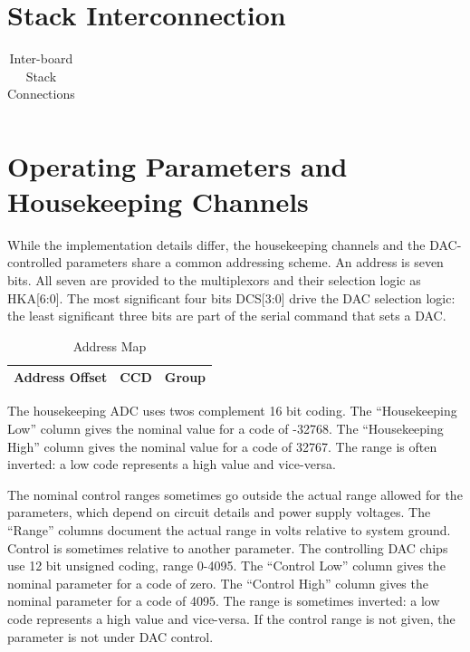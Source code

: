 \documentclass[12pt]{article}
\let\oldsection\section
\renewcommand{\section}{\FloatBarrier\oldsection}
\begin{document}
\section{Stack Interconnection}

\tiny{
    \begin{longtable}{|m{}|m{}|m{}|m{}|m{}|m{}|m{}|m{}|@{}m{0pt}@{}}
    \caption{Inter-board Stack Connections} \label{Stack} \\
    \hline
    
    \end{longtable}
}

\normalsize

\section{Operating Parameters and Housekeeping Channels}
\label{param}

While the implementation details differ, the housekeeping channels and the DAC-controlled parameters share a common addressing scheme. An address is seven bits. All seven are provided to the multiplexors and their selection logic as HKA[6:0]. The most significant four bits DCS[3:0] drive the DAC selection logic: the least significant three bits are part of the serial command that sets a DAC. 

\begin{table}[ht!]
\caption{Address Map}
\begin{center}
\begin{tabular}{|l|l|l|}
\hline
Address Offset & CCD & Group \\
\hline

\hline
\end{tabular}
\end{center}
\vspace{5pt}

\label{hkmap}
\end{table}

The housekeeping ADC uses twos complement 16 bit coding. The ``Housekeeping Low'' column gives the nominal value for a code of -32768. The ``Housekeeping High'' column gives the nominal value for a code of 32767. The range is often inverted: a low code represents a high value and vice-versa.

The nominal control ranges sometimes go outside the actual range allowed for the parameters, which depend on circuit details and power supply voltages. The ``Range'' columns document the actual range in volts relative to system ground. Control is sometimes relative to another parameter. The controlling DAC chips use 12 bit unsigned coding, range 0-4095. The ``Control Low'' column gives the nominal parameter for a code of zero. The ``Control High'' column gives the nominal parameter for a code of 4095. The range is sometimes inverted: a low code represents a high value and vice-versa. If the control range is not given, the parameter is not under DAC control.
\end{document}
